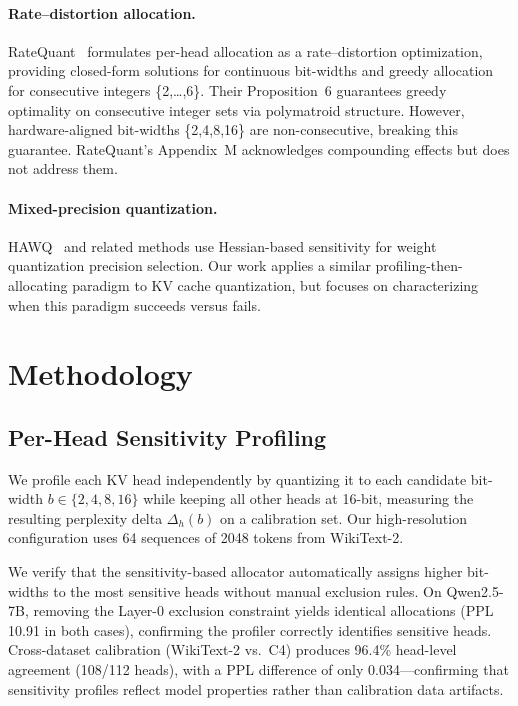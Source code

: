 \documentclass[11pt,a4paper]{article}
\begin{document}
\paragraph{Rate--distortion allocation.}
RateQuant~\cite{zhang2024ratequant} formulates per-head allocation as a rate--distortion optimization, providing closed-form solutions for continuous bit-widths and greedy allocation for consecutive integers \{2,\ldots,6\}.
Their Proposition~6 guarantees greedy optimality on consecutive integer sets via polymatroid structure.
However, hardware-aligned bit-widths \{2,4,8,16\} are non-consecutive, breaking this guarantee.
RateQuant's Appendix~M acknowledges compounding effects but does not address them.

\paragraph{Mixed-precision quantization.}
HAWQ~\cite{dong2020hawq} and related methods use Hessian-based sensitivity for weight quantization precision selection.
Our work applies a similar profiling-then-allocating paradigm to KV cache quantization, but focuses on characterizing when this paradigm succeeds versus fails.

\section{Methodology}\label{sec:method}

\subsection{Per-Head Sensitivity Profiling}

We profile each KV head independently by quantizing it to each candidate bit-width $b \in \{2,4,8,16\}$ while keeping all other heads at 16-bit, measuring the resulting perplexity delta $\Delta_h(b)$ on a calibration set.
Our high-resolution configuration uses 64 sequences of 2048 tokens from WikiText-2.

We verify that the sensitivity-based allocator automatically assigns higher bit-widths to the most sensitive heads without manual exclusion rules.
On Qwen2.5-7B, removing the Layer-0 exclusion constraint yields identical allocations (PPL 10.91 in both cases), confirming the profiler correctly identifies sensitive heads.
Cross-dataset calibration (WikiText-2 vs.\ C4) produces 96.4\% head-level agreement (108/112 heads), with a PPL difference of only 0.034---confirming that sensitivity profiles reflect model properties rather than calibration data artifacts.
\end{document}
